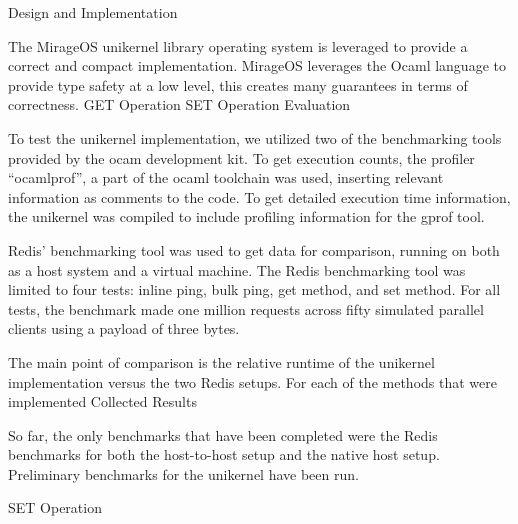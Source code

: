 \documentclass[english,10pt,twocolumn]{article}
\begin{document}
Design and Implementation

The MirageOS unikernel library operating system is leveraged to provide a correct and compact implementation. MirageOS leverages the Ocaml language to provide type safety at a low level, this creates many guarantees in terms of correctness.
GET Operation
SET Operation
Evaluation

To test the unikernel implementation, we utilized two of the benchmarking tools provided by the  ocam development kit. To get execution counts, the profiler “ocamlprof”, a part of the ocaml toolchain was used, inserting relevant information as comments to the code. To get detailed execution time information, the unikernel was compiled to include profiling information for the gprof tool.

Redis’ benchmarking tool was used to get data for comparison, running on both as a host system and a virtual machine. The Redis benchmarking tool was limited to four tests: inline ping, bulk ping, get method, and set method. For all tests, the benchmark made one million requests across fifty simulated parallel clients using a payload of three bytes.

The main point of comparison is the relative runtime of the unikernel implementation versus the two Redis setups. For each of the methods that were implemented
Collected Results

So far, the only benchmarks that have been completed were the Redis benchmarks for both the host-to-host setup and the native host setup. Preliminary benchmarks for the unikernel have been run.

SET Operation



\nocite{*}


\end{document}
